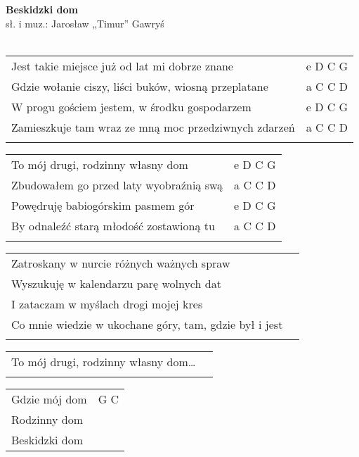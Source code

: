 \documentclass[a5paper]{article}
\begin{document}


\noindent
\fontsize{12pt}{15pt}\selectfont
\textbf{Beskidzki dom} \\
\fontsize{8pt}{10pt}\selectfont
sł. i muz.: Jarosław „Timur” Gawryś \\ \\
\fontsize{10pt}{12pt}\selectfont
{}
\begin{tabular}{@{}p{9.50cm}p{3cm}@{}}
\noindent
Jest takie miejsce już od lat mi dobrze znane & e D C G \\
Gdzie wołanie ciszy, liści buków, wiosną przeplatane & a C C D \\
W progu gościem jestem, w środku gospodarzem & e D C G \\
Zamieszkuje tam wraz ze mną moc przedziwnych zdarzeń & a C C D \\\\
\end{tabular}

\noindent
\begin{tabular}{@{}p{8.50cm}p{3cm}@{}}
To mój drugi, rodzinny własny dom & e D C G \\
Zbudowałem go przed laty wyobraźnią swą & a C C D \\
Powędruję babiogórskim pasmem gór & e D C G \\
By odnaleźć starą młodość zostawioną tu & a C C D \\ \\
\end{tabular}

\noindent
\begin{tabular}{@{}p{11.50cm}p{3cm}@{}}
Zatroskany w nurcie różnych ważnych spraw \\
Wyszukuję w kalendarzu parę wolnych dat \\
I zataczam w myślach drogi mojej kres \\
Co mnie wiedzie w ukochane góry, tam, gdzie był i jest \\ \\
\end{tabular}

\noindent
\begin{tabular}{@{}p{9.50cm}p{3cm}@{}}
To mój drugi, rodzinny własny dom… \\ \\
\end{tabular}

\noindent
\begin{tabular}{@{}p{7.50cm}p{3cm}@{}}
Gdzie mój dom & G C \\
Rodzinny dom \\
Beskidzki dom
\end{tabular}
\end{document}
